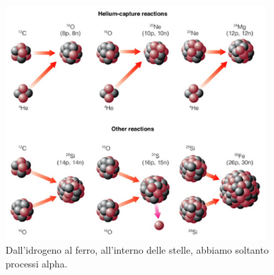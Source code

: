 \documentclass[a4paper,11pt]{article}
\begin{document}
    \begin{figure}[h!!]
        \centering
        \includegraphics[width=10cm]{lezione 28 novembre/processialpha.png}
        \caption{Dall'idrogeno al ferro, all'interno delle stelle, abbiamo soltanto processi alpha.}
        \label{lezione 28 novembre/processialpha.png}
    \end{figure}
\end{document}
